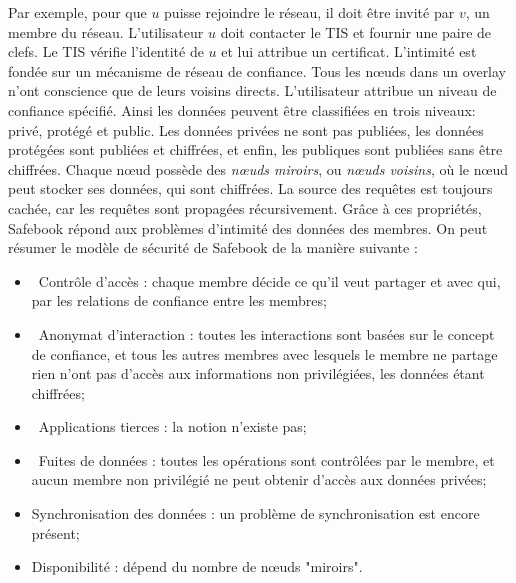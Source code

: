 Par exemple, pour que $u$ puisse rejoindre le réseau, il doit être invité par $v$, un
membre du réseau. L'utilisateur $u$ doit contacter le TIS et fournir une paire de clefs. Le TIS
vérifie l’identité de $u$ et lui attribue un certificat. L’intimité est fondée sur
un mécanisme de réseau de confiance. Tous les nœuds dans un overlay n’ont
conscience que de leurs voisins directs. L’utilisateur attribue un niveau de
confiance spécifié. Ainsi les données peuvent être classifiées en trois
niveaux: privé, protégé et public. Les données privées ne sont pas
publiées, les données protégées sont publiées et chiffrées, et enfin, les publiques sont
publiées sans être chiffrées. Chaque nœud possède des \textit{nœuds miroirs}, ou \textit{nœuds
voisins}, où le nœud peut stocker ses données, qui sont chiffrées.  La source
des requêtes est toujours cachée, car les requêtes sont propagées
récursivement.  Grâce à ces propriétés, Safebook répond aux problèmes d'intimité
des données des membres. On peut résumer le modèle de sécurité de Safebook de la
manière suivante :

\begin{itemize}
\item Contrôle d’accès : chaque membre décide ce qu’il veut partager et avec
qui, par les relations de confiance entre les membres;

\item Anonymat d’interaction : toutes les interactions sont basées sur le
concept de confiance, et tous les autres membres avec lesquels le membre ne
partage rien n’ont pas d’accès aux informations non privilégiées, les données
étant chiffrées;

\item Applications tierces : la notion n'existe pas;

\item Fuites de données : toutes les opérations sont contrôlées par le membre, et
aucun membre non privilégié ne peut obtenir d’accès aux données privées;

\item Synchronisation des données : un problème de synchronisation est encore présent;

\item Disponibilité : dépend du nombre de nœuds "miroirs".
\end{itemize}
